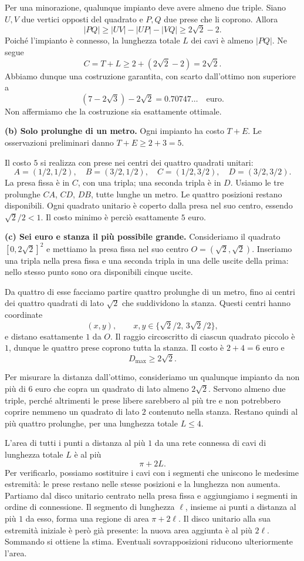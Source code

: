 {Per una minorazione, qualunque impianto deve avere almeno due triple.
Siano $U,V$ due vertici opposti del quadrato e $P,Q$ due prese che
li coprono. Allora
\[
 |PQ|\geq |UV|-|UP|-|VQ|\geq2\sqrt2-2.
\]
Poich\'e l'impianto \`e connesso, la lunghezza totale $L$ dei cavi
\`e almeno $|PQ|$. Ne segue
\[
 C=T+L\geq2+(2\sqrt2-2)=2\sqrt2.
\]
Abbiamo dunque una costruzione garantita, con scarto dall'ottimo
non superiore a
\[
 (7-2\sqrt3)-2\sqrt2=0.70747\ldots\quad\text{euro}.
\]
Non affermiamo che la costruzione sia esattamente ottimale.

\textbf{(b) Solo prolunghe di un metro.}
Ogni impianto ha costo $T+E$. Le osservazioni preliminari danno
$T+E\geq2+3=5$.

Il costo $5$ si realizza con prese nei centri dei quattro quadrati
unitari:
\[
 A=(1/2,1/2),\quad B=(3/2,1/2),\quad
 C=(1/2,3/2),\quad D=(3/2,3/2).
\]
La presa fissa \`e in $C$, con una tripla; una seconda tripla \`e in
$D$. Usiamo le tre prolunghe $CA$, $CD$, $DB$, tutte lunghe un metro.
Le quattro posizioni restano disponibili. Ogni quadrato unitario
\`e coperto dalla presa nel suo centro, essendo $\sqrt2/2<1$.
Il costo minimo \`e perci\`o esattamente $5$ euro.

\textbf{(c) Sei euro e stanza il pi\`u possibile grande.}
Consideriamo il quadrato $[0,2\sqrt2]^2$ e mettiamo la presa fissa
nel suo centro $O=(\sqrt2,\sqrt2)$. Inseriamo una tripla nella presa
fissa e una seconda tripla in una delle uscite della prima: nello
stesso punto sono ora disponibili cinque uscite.

Da quattro di esse facciamo partire quattro prolunghe di un metro,
fino ai centri dei quattro quadrati di lato $\sqrt2$ che suddividono
la stanza. Questi centri hanno coordinate
\[
 (x,y),\qquad x,y\in\{\sqrt2/2,\,3\sqrt2/2\},
\]
e distano esattamente $1$ da $O$. Il raggio circoscritto di ciascun
quadrato piccolo \`e $1$, dunque le quattro prese coprono tutta la
stanza. Il costo \`e $2+4=6$ euro e
\[
 D_{\max}\geq2\sqrt2.
\]

Per misurare la distanza dall'ottimo, consideriamo un qualunque
impianto da non pi\`u di $6$ euro che copra un quadrato di lato
almeno $2\sqrt2$. Servono almeno due triple, perch\'e altrimenti
le prese libere sarebbero al pi\`u tre e non potrebbero coprire
nemmeno un quadrato di lato $2$ contenuto nella stanza. Restano
quindi al pi\`u quattro prolunghe, per una lunghezza totale $L\leq4$.

L'area di tutti i punti a distanza al pi\`u $1$ da una rete connessa
di cavi di lunghezza totale $L$ \`e al pi\`u
\[
 \pi+2L.
\]
Per verificarlo, possiamo sostituire i cavi con i segmenti che
uniscono le medesime estremit\`a: le prese restano nelle stesse
posizioni e la lunghezza non aumenta. Partiamo dal disco unitario
centrato nella presa fissa e aggiungiamo i segmenti in ordine di
connessione. Il segmento di lunghezza $\ell$, insieme ai punti
a distanza al pi\`u $1$ da esso, forma una regione di area
$\pi+2\ell$. Il disco unitario alla sua estremit\`a iniziale \`e
per\`o gi\`a presente: la nuova area aggiunta \`e al pi\`u $2\ell$.
Sommando si ottiene la stima. Eventuali sovrapposizioni riducono
ulteriormente l'area.

}
